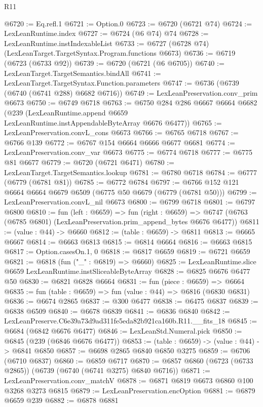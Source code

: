 \begin{lexlean}{R11}
\begin{coremodule}
@6720 := Eq.refl.{1}
@6721 := Option.{0}
@6723 := @6720 (@6721 @74)
@6724 := LexLeanRuntime.index
@6727 := @6724 (@6 @74) @74
@6728 := LexLeanRuntime.instIndexableList
@6733 := @6727 (@6728 @74) (LexLeanTarget.TargetSyntax.Program.functions @6673)
@6736 := @6719 (@6723 (@6733 @92))
@6739 := @6720 (@6721 (@6 @6705))
@6740 := LexLeanTarget.TargetSemantics.bindAll
@6741 := LexLeanTarget.TargetSyntax.Function.parameters
@6747 := @6736 (@6739 (@6740 (@6741 @288) @6682 @6716))
@6749 := LexLeanPreservation.conv_prim @6673
@6750 := @6749 @6718
@6763 := @6750
    @284
    @286
    @6667
    @6664
    @6682
    (@239 (LexLeanRuntime.append @6659 LexLeanRuntime.instAppendableByteArray @6676 @6477))
@6765 := LexLeanPreservation.convL_cons @6673
@6766 := @6765 @6718
@6767 := @6766 @139
@6772 := @6767 @154 @6664 @6666 @6677 @6681
@6774 := LexLeanPreservation.conv_var @6673
@6775 := @6774 @6718
@6777 := @6775 @81 @6677
@6779 := @6720 (@6721 @6471)
@6780 := LexLeanTarget.TargetSemantics.lookup
@6781 := @6780 @6718
@6784 := @6777 (@6779 (@6781 @81))
@6785 := @6772 @6784
@6797 := @6766 @152 @121 @6664 @6664 @6679 @6509 (@6775 @50 @6679 (@6779 (@6781 @50)))
@6799 := LexLeanPreservation.convL_nil @6673
@6800 := @6799 @6718
@6801 := @6797 @6800
@6810 := fun (left : @6659) =>
  fun (right : @6659) =>
  @6747 (@6763 (@6785 @6801) (LexLeanPreservation.prim_append_bytes @6676 @6477))
@6811 := (value : @44) -> @6660
@6812 := (table : @6659) -> @6811
@6813 := @6665 @6667
@6814 := @6663 @6813
@6815 := @6814 @6664
@6816 := @6663 @6815
@6817 := Option.casesOn.{1, 0}
@6818 := @6817 @6659
@6819 := @6721 @6659
@6821 := @6818 (fun ("_" : @6819) => @6660)
@6825 := LexLeanRuntime.slice @6659 LexLeanRuntime.instSliceableByteArray
@6828 := @6825 @6676 @6477 @50
@6830 := @6821 @6828 @6664
@6831 := fun (piece : @6659) => @6664
@6835 := fun (table : @6659) => fun (value : @44) => @6816 (@6830 @6831)
@6836 := @6674 @2865
@6837 := @300 @6477
@6838 := @6475 @6837
@6839 := @6838 @6509
@6840 := @6678 @6839
@6841 := @6836 @6840
@6842 := LexLeanPreserve.C6e39a73d9ad311fe5eda82b921ca160b.R11.__fits_18
@6845 := @6684 (@6842 @6676 @6477)
@6846 := LexLeanStd.Numeral.pick
@6850 := @6845 (@239 (@6846 @6676 @6477))
@6853 := (table : @6659) -> (value : @44) -> @6841 @6850
@6857 := @6698 @2865 @6840 @6850 @3275
@6859 := @6706 (@6710 @6837)
@6860 := @6859 @6717
@6870 := @6857 @6860 (@6723 (@6733 @2865)) (@6739 (@6740 (@6741 @3275) @6840 @6716))
@6871 := LexLeanPreservation.conv_matchV
@6878 := @6871 @6819 @6673 @6860 @100 @3268 @3273 @6815
@6879 := LexLeanPreservation.encOption
@6881 := @6879 @6659 @239
@6882 := @6878 @6881

\end{coremodule}
\end{lexlean}
